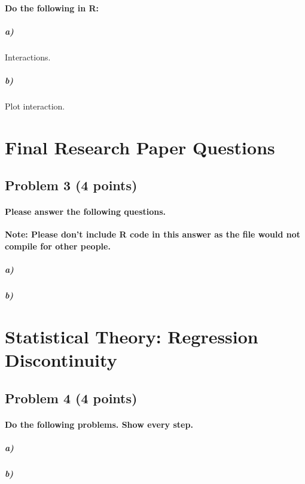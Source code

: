 \documentclass[12pt]{article}
\begin{document}
\paragraph{Do the following in R:}

\subparagraph{a)} Interactions.

\subparagraph{b)} Plot interaction.



\section*{Final Research Paper Questions}

\subsection*{Problem 3 (4 points)}

\paragraph{Please answer the following questions.}

\textbf{Note: Please don't include R code in this answer as the file would not compile for other people.} 

\subparagraph{a)} 

\subparagraph{b)} 



\section*{Statistical Theory: Regression Discontinuity}

\subsection*{Problem 4 (4 points)}

\paragraph{Do the following problems. Show every step.}

\subparagraph{a)}

\subparagraph{b)}
\end{document}
